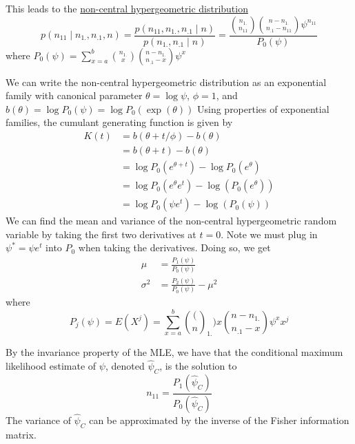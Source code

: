 \documentclass[12pt]{article}
\numberwithin{equation}{section}
\begin{document}
This leads to the \underline{non-central hypergeometric distribution}
\begin{equation*}
  p(n_{11} \mid n_{1.}, n_{.1}, n)
    = \frac{p(n_{11}, n_{1.}, n_{.1} \mid n)}{p(n_{1.}, n_{.1} \mid n)}
    = \frac{\binom{n_{1.}}{n_{11}} \binom{n - n_{1.}}{n_{.1} - n_{11}} \psi^{n_{11}}}{P_0(\psi)}
\end{equation*}
where $P_0(\psi) = \sum_{x = a}^b \binom{n_{1.}}{x} \binom{n - n_{1.}}{n_{.1} - x} \psi^x$

We can write the non-central hypergeometric distribution as an exponential family with canonical parameter $\theta = \log{\psi}$, $\phi = 1$, and $b(\theta) = \log{P_0(\psi)} = \log{P_0(\exp(\theta))}$ Using properties of exponential families, the cumulant generating function is given by
\begin{align*}
  K(t) &= b(\theta + t / \phi) - b(\theta) \\
    &= b(\theta + t)  - b(\theta) \\
    &= \log{P_0(e^{\theta + t})} - \log{P_0(e^{\theta})} \\
    &= \log{P_0(e^{\theta} e^t)} - \log(P_0(e^{\theta})) \\
    &= \log{P_0(\psi e^t)} - \log(P_0(\psi))
\end{align*}
%
We can find the mean and variance of the non-central hypergeometric random variable by taking the first two derivatives at $t = 0$. Note we must plug in $\psi^* = \psi e^t$ into $P_0$ when taking the derivatives. Doing so, we get
\begin{align*}
  \mu &= \frac{P_1(\psi)}{P_0(\psi)} \\
  \sigma^2 &= \frac{P_2(\psi)}{P_0(\psi)} - \mu^2
\end{align*}
where
\begin{equation*}
  P_j(\psi) = E(X^j) = \sum_{x = a}^b \binom(n_{1.}){x} \binom{n - n_{1.}}{n_{.1} - x} \psi^x x^j
\end{equation*}

By the invariance property of the MLE, we have that the conditional maximum likelihood estimate of $\psi$, denoted $\hat{\psi}_C$, is the solution to
\begin{equation*}
  n_{11} = \frac{P_1(\hat{\psi}_C)}{P_0(\hat{\psi}_C)}
\end{equation*}
The variance of $\hat{\psi}_C$ can be approximated by the inverse of the Fisher information matrix.
%
%
\end{document}
